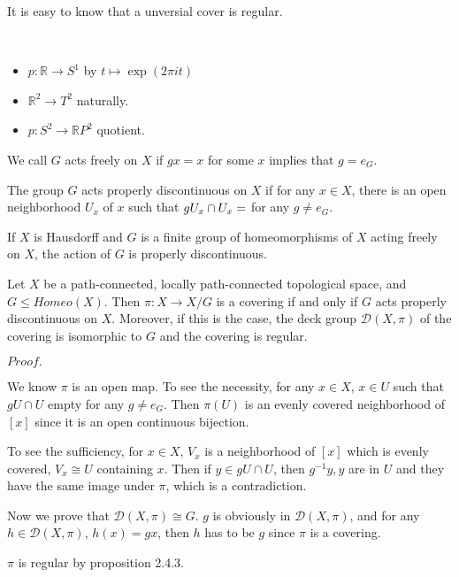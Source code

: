 \documentclass{article}
\newcommand{\Pf}[1]{$Proof.$\par}
\begin{document}
It is easy to know that a unversial cover is regular.

\begin{example}\ \par
    \begin{itemize}
        \item $p:\mathbb{R} \to S^1$ by $t\mapsto \exp(2\pi it)$
        \item $\mathbb{R}^2 \to T^2$ naturally.
        \item $p:S^2 \to \mathbb{R}P^2$ quotient.
    \end{itemize}
\end{example}

\begin{definition}
    We call $G$ acts freely on $X$ if $gx =  x$ for some $x$ implies that $g = e_G$.
\end{definition}

\begin{definition}
    The group $G$ acts properly discontinuous on $X$ if for any $x\in X$, there is an open neighborhood $U_x$ of $x$ such that $gU_x\cap U_x =\empty$ for any $g\neq e_G$.
\end{definition}

\begin{proposition}
    If $X$ is Hausdorff and $G$ is a finite group of homeomorphisms of $X$ acting freely on $X$, the action of $G$ is properly discontinuous.
\end{proposition}

\begin{theorem}
    Let $X$ be a path-connected, locally path-connected topological space, and $G\leq Homeo(X)$. Then $\pi:X\to X/G$ is a covering if and only if $G$ acts properly discontinuous on $X$. Moreover, if this is the case, the deck group $\mathcal{D}(X,\pi)$ of the covering is isomorphic to $G$ and the covering is regular.
\end{theorem}
\Pf\par
    We know $\pi$ is an open map. To see the necessity, for any $x\in X$, $x\in U$ such that $gU\cap U$ empty for any $g \neq e_G$. Then $\pi(U)$ is an evenly covered neighborhood of $[x]$ since it is an open continuous bijection.\par
    To see the sufficiency, for $x\in X$, $V_x$ is a neighborhood of $[x]$ which is evenly covered, $V_x \cong U$ containing $x$. Then if $y\in gU\cap U$, then $g^{-1}y, y$ are in $U$ and they have the same image under $\pi$, which is a contradiction.\par
    Now we prove that $\mathcal{D}(X,\pi) \cong G$. $g$ is obviously in $\mathcal{D}(X,\pi)$, and for any $h\in \mathcal{D}(X,\pi)$, $h(x) = gx$, then $h$ has to be $g$ since $\pi$ is a covering.\par
    $\pi$ is regular by proposition 2.4.3.
\end{document}
